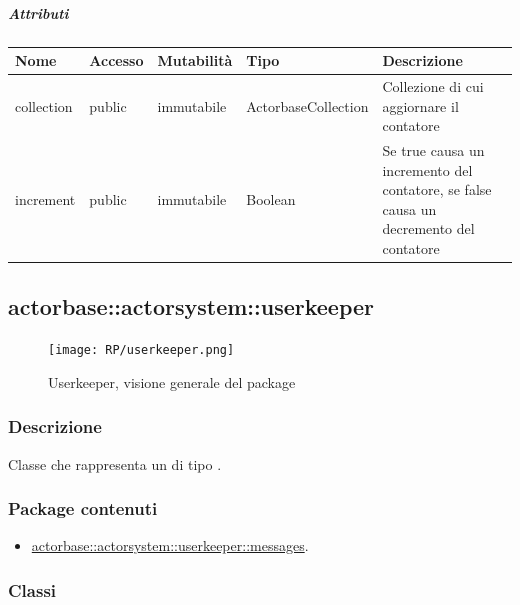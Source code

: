\documentclass{scalatekids-article}
\begin{document}
\subparagraph{Attributi}
\begin{tabular}{| p{3cm} | p{1.5cm} | p{2cm} | p{2cm} | p{8.5cm} |}
  \hline
  Nome & Accesso & Mutabilità & Tipo & Descrizione\\
  \hline
  collection & public & immutabile & ActorbaseCollection & Collezione di cui aggiornare il contatore \\
  \hline
  increment & public & immutabile & Boolean & Se true causa un incremento del contatore, se false causa un decremento del contatore \\
  \hline
\end{tabular}



\subsection{actorbase::actorsystem::userkeeper} %
\label{sec:actorbase::actorsystem::userkeeper}

\begin{figure}[H]
  \begin{center}
    \texttt{[image: RP/userkeeper.png]}
    \caption{Userkeeper, visione generale del package}
  \end{center}
\end{figure}

\subsubsection{Descrizione}
Classe che rappresenta un  di tipo .

\subsubsection{Package contenuti}
\begin{itemize}
\item \hyperref[sec:actorbase::actorsystem::userkeeper::messages]{actorbase::actorsystem::userkeeper::messages}.
\end{itemize}

\subsubsection{Classi}
\end{document}
